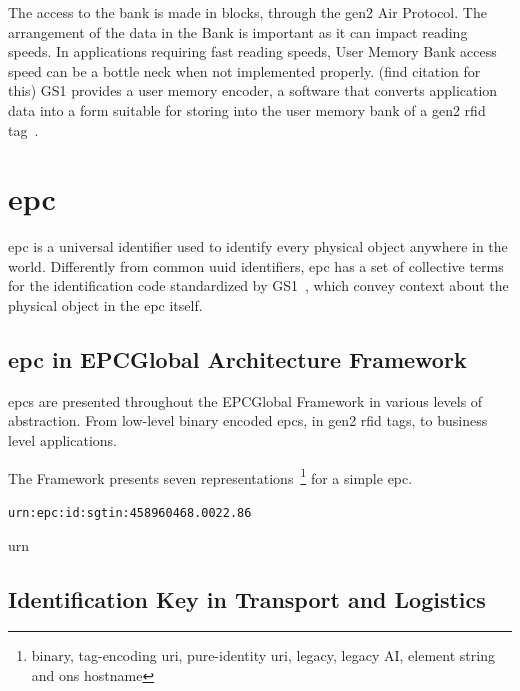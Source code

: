 The access to the bank is made in blocks, through the \ac{gen2} Air Protocol. The arrangement of the data in the Bank is important as it can impact reading speeds.
In applications requiring fast reading speeds, User Memory Bank access speed can be a bottle neck when not implemented properly. (find citation for this)
GS1 provides a user memory encoder, a software that converts application data into a form suitable for storing into the user memory bank of a \ac{gen2} \ac{rfid} tag~\cite{marco.santos.diamondFAQ2020}.

\section{\ac{epc}} \label{sec:epc}



\ac{epc} is a universal identifier used to identify every physical object anywhere in the world.
Differently from common \ac{uuid} identifiers, \ac{epc} has a set of collective terms for the identification code standardized by GS1~\cite{GS1GeneralSpecifications}, which convey context about the physical object in the \ac{epc} itself.

\subsection{\ac{epc} in EPCGlobal Architecture Framework}

\acp{epc} are presented throughout the EPCGlobal Framework in various levels of abstraction. From low-level binary encoded \acp{epc}, in \ac{gen2} \ac{rfid} tags, to business level applications.

The Framework presents seven representations~\footnote{binary, tag-encoding \ac{uri}, pure-identity \ac{uri}, legacy, legacy AI, element string and \ac{ons} hostname} for a simple \ac{epc}. 

\texttt{urn:epc:id:sgtin:458960468.0022.86}






urn~\cite{meallingUniformResourceName}

\subsection{Identification Key in Transport and Logistics}

